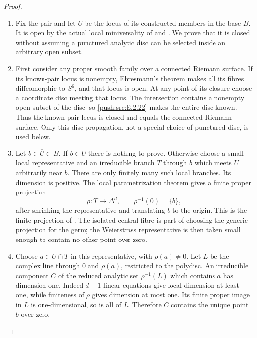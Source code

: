 \begin{proof}

\begin{enumerate}[label={$\langle1\rangle$\arabic*.},leftmargin=*]
\item Fix the pair and let $U$ be the locus of its constructed
members in the base $B$.  It is open by the actual local
miniversality of  and .  We prove that it is
closed without assuming a punctured analytic disc can
be selected inside an arbitrary open subset.

\item First consider any proper smooth family over a connected
Riemann surface.  If its known-pair locus is nonempty,
Ehresmann's theorem makes all its fibres diffeomorphic
to $S^6$, and that locus is open.  At any point of its closure choose a
coordinate disc meeting that locus.  The intersection
contains a nonempty open subset of the disc, so \ref{push:src:E.2.22}
makes the entire disc known.  Thus the known-pair locus
is closed and equals the connected Riemann surface.
Only this disc propagation, not a special choice of
punctured disc, is used below.

\item Let $b\in\overline U\subset B$.  If $b\in U$ there
is nothing to prove.  Otherwise choose a small local
representative and an irreducible branch $T$ through
$b$ which meets $U$ arbitrarily near $b$.  There are
only finitely many such local branches.  Its dimension
is positive.  The local parametrization theorem gives
a finite proper projection
\[
 \rho:T\longrightarrow\Delta^d,
 \qquad \rho^{-1}(0)=\{b\},
 \tag{E.2.23.1}
\]
after shrinking the representative and translating
$b$ to the origin.  This is the finite projection
of \citet[Chapter~II, Theorem~4.19, pp.~95--96]{Demailly2012E}.
The isolated central fibre is part of choosing
the generic projection for the germ; the
Weierstrass representative is then taken small
enough to contain no other point over zero.

\item Choose $a\in U\cap T$ in this representative,
with $\rho(a)\ne0$.  Let $L$ be the complex
line through $0$ and $\rho(a)$, restricted
to the polydisc.  An irreducible component
$C$ of the reduced analytic set
$\rho^{-1}(L)$ which contains $a$ has
dimension one.  Indeed $d-1$ linear
equations give local dimension at least
one, while finiteness of $\rho$ gives
dimension at most one.  Its finite
proper image in $L$ is one-dimensional,
so is all of $L$.  Therefore $C$ contains
the unique point $b$ over zero.


\end{enumerate}
\end{proof}
